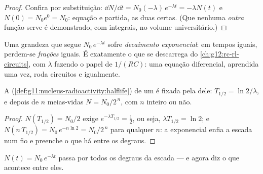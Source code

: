 \begin{proof}
Confira por substituição: $\dd N/\dd t = N_0(-\lambda)\,e^{-\lambda t} = -\lambda N(t)$
e $N(0) = N_0 e^0 = N_0$: equação e partida, as duas certas. (Que nenhuma \emph{outra}
função serve é demonstrado, com integrais, no volume universitário.)
\end{proof}

\begin{definition}\label{def:g12:radioactive-decay:exponential}
Uma grandeza que segue $N_0\,e^{-\lambda t}$ sofre \emph{decaimento
exponencial}: em tempos iguais, perdem-se \emph{frações}
iguais. É exatamente o  que se descarrega do \cref{ch:g12:rc-rl-circuits}, com
$\lambda$ fazendo o papel de $1/(RC)$: uma equação diferencial, aprendida uma vez, roda
circuitos e  igualmente.
\end{definition}

\begin{proposition}\label{prop:g12:radioactive-decay:halflife}
A  (\cref{def:g11:nucleus-radioactivity:halflife}) de um  é fixada pela
 dele: $T_{1/2} = \ln 2/\lambda$, e depois de $n$ meias-vidas
$N = N_0/2^{\,n}$, com $n$ inteiro ou não.
\end{proposition}

\begin{proof}
$N(T_{1/2}) = N_0/2$ exige $e^{-\lambda T_{1/2}} = \tfrac12$, ou seja,
$\lambda T_{1/2} = \ln 2$; e $N(n\,T_{1/2}) = N_0\,e^{-n\ln 2} = N_0/2^{\,n}$ para
qualquer $n$: a exponencial enfia a escada num fio e preenche o que há entre os degraus.
\end{proof}

\begin{omfigure}

{\small $N(t) = N_0\,e^{-\lambda t}$ passa por todos os degraus da escada --- e agora diz
o que acontece entre eles.}
\end{omfigure}

